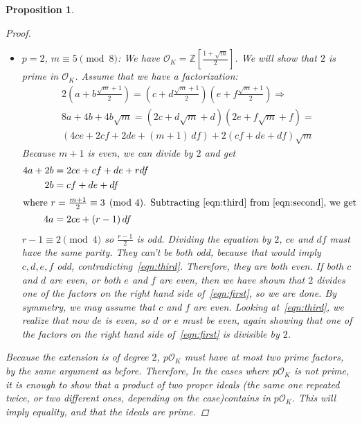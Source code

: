 \documentclass[11pt]{article}
\newtheorem{prop}{Proposition}
\theoremstyle{definition}
\begin{document}
\begin{prop}
\begin{proof}
\begin{itemize}
                \item $p=2$, $m \equiv 5 \pmod 8$: We have $\mathcal{O}_K = \mathbb{Z}\left[\frac{1+\sqrt {m}}{2}\right]$.
                We will show that $2$ is prime in $\mathcal{O}_K$.
                Assume that we have a factorization:
                \begin{gather}
                    2\left(a+b\frac{\sqrt {m}+1}{2}\right) = \left(c+d\frac{\sqrt {m}+1}{2}\right)\left(e+f\frac{\sqrt {m}+1}{2}\right) \Rightarrow \label{eqn:first} \\
                    8a + 4b + 4b\sqrt {m} =
                    (2c+d\sqrt {m}+d)(2e+f\sqrt {m}+f) = \nonumber \\
                    (4ce + 2cf + 2de + (m+1)\,df) + 2(cf+de+df)\sqrt {m} \nonumber
                \end{gather}
                Because $m+1$ is even, we can divide by $2$ and get
                \begin{align}
                    4a + 2b &= 2ce + cf + de + rdf \label{eqn:second} \\
                    2b &= cf+ de + df \label{eqn:third} \\
                \intertext{where $r = \frac{m+1}{2} \equiv 3 \pmod 4$. Subtracting~\eqref{eqn:third} from~\eqref{eqn:second}, we get}
                    4a &= 2ce + (r-1)\,df \nonumber
                \end{align}
                $r - 1 \equiv 2 \pmod 4$ so $\frac{r-1}{2}$ is odd.
                Dividing the equation by $2$,
                $ce$ and $df$ must have the same parity.
                They can't be both odd, because that would imply $c, d, e, f$ odd,
                contradicting~\eqref{eqn:third}.
                Therefore, they are both even.
                If both $c$ and $d$ are even, or both $e$ and $f$ are even, then
                we have shown that $2$ divides one of the factors on the right hand side of~\eqref{eqn:first},
                so we are done.
                By symmetry, we may assume that $c$ and $f$ are even.
                Looking at~\eqref{eqn:third}, we realize that now $de$ is even, so $d$ or $e$ must be even,
                again showing that one of the factors on the right hand side of~\eqref{eqn:first} is divisible by $2$.
            \end{itemize}
            Because the extension is of degree $2$, $p\mathcal{O}_K$ must have at most two prime factors, by the same argument as before.
            Therefore, In the cases where $p\mathcal{O}_K$ is not prime, it is enough to show that a product of two proper ideals
            (the same one repeated twice, or two different ones, depending on the case)contains in $p\mathcal{O}_K$.
            This will imply equality, and that the ideals are prime.



\end{proof}
\end{prop}
\end{document}

